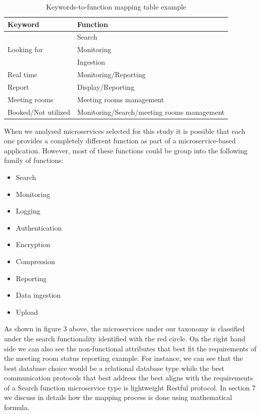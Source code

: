 \documentclass{article}
\begin{document}
\begin{table}[h!]
  \begin{center}
  \small
    \begin{tabular}{|l|l|} %
    \hline
    \textbf{Keyword} & \textbf{Function}\\
    \hline
      \multirow{3}{*}{Looking for} & Search\\
      & Monitoring\\ 
      & Ingestion\\
      \hline
      Real time & Monitoring/Reporting\\
      \hline
      Report & Display/Reporting\\
      \hline
      Meeting rooms & Meeting rooms management\\
      \hline
      Booked/Not utilized & Monitoring/Search/meeting rooms management\\
      \hline
    \end{tabular}
        \caption{Keywords-to-function mapping table example}
    \label{tab:Table 2}
  \end{center}
\end{table}


When we analysed microservices selected for this study it is possible that each one provides a completely different function as part of a microservice-based application. However, most of these functions could be group into the following family of functions:

\begin{itemize}


\item Search
\item Monitoring
\item Logging
\item Authentication
\item Encryption
\item Compression
\item Reporting
\item Data ingestion
\item Upload
\end{itemize}

As shown in figure 3 above, the microservices under our taxonomy is classified under the search functionality identified with the red circle. On the right hand side we can also see the non-functional attributes that best fit the requirements of the meeting room status reporting example. For instance, we can see that the best database choice would be a relational database type while the best communication protocols that best address the best aligns with the requirements of a Search function microservice type is lightweight Restful protocol. In section 7 we discuss in details how the mapping process is done using mathematical formula.
\end{document}
